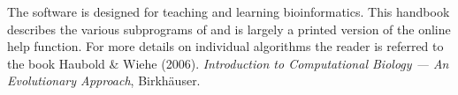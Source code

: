 The software  is designed for teaching and learning
bioinformatics. This handbook describes the various subprograms of
 and is largely a printed version of the online help
function. For more details on individual algorithms the reader
is referred to the book Haubold \& Wiehe
(2006). \textit{Introduction to Computational Biology --- An
  Evolutionary Approach}, Birkh\"auser.  

